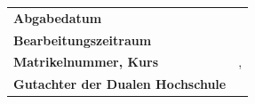 {\begin{titlepage}
\begin{center}
		\begin{spacing}{0.8}
			\begin{tabular}{ll}
				\textbf{Abgabedatum}				\hspace{4.5cm}					& \printdate{\abgabeDatum}\\[0.2cm]
				\textbf{Bearbeitungszeitraum}       				&  \daterange{\bearbeitungszeitraumBeginn}{\bearbeitungszeitraumEnde}\\[0.2cm]
				\textbf{Matrikelnummer, Kurs} 					   	&  \matrikelnr, \kurs\\[0.2cm]
				\textbf{Gutachter der Dualen Hochschule}    &  \betreuerDhbw\\[0.2cm]
			\end{tabular} 
		\end{spacing}
	\end{center}
\end{titlepage}
}